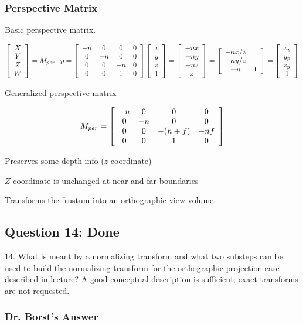 \documentclass[11pt]{article}
\begin{document}
\begin{spacing}{1.2}
\subsubsection{Perspective Matrix}

Basic perspective matrix.  


$$
\left[
	\begin{array}{cccc}
		X \cr
		Y \cr
		Z \cr
		W \cr
	\end{array}
\right]
=
M_{per} \cdot p = 
\left[
	\begin{array}{cccc}
		-n & 0 & 0 & 0 \cr
		0 & -n & 0 & 0 \cr
		0 & 0 & -n & 0 \cr
		0 & 0 & 1 & 0 \cr
	\end{array}
\right]
\left[
	\begin{array}{cccc}
		x \cr y \cr z \cr 1
	\end{array}
\right]
= 
\left[
	\begin{array}{cccc}
		-nx \cr -ny \cr -nz \cr z
	\end{array}
\right]
=
\left[
	\begin{array}{cccc}
		-nx/z \cr -ny/z \cr -n & 1 \cr
	\end{array}
\right]
=
\left[
	\begin{array}{cccc}
		x_p \cr y_p \cr z_p \cr 1 \cr
	\end{array}
\right]
$$

Generalized perspective matrix

$$
M_{per} = 
\left[
	\begin{array}{cccc}
		-n & 0 & 0 & 0 \cr
		0 & -n & 0 & 0 \cr
		0 & 0 & -(n+f) & -nf \cr
		0 & 0 & 1 & 0 \cr
	\end{array}
\right]
$$

Preserves some depth info ($z$ coordinate)

$Z$-coordinate is unchanged at near and far boundaries

Transforms the frustum into an orthographic view volume.  

\subsection{Question 14:  Done}
14.  What is meant by a normalizing transform and what two substeps can be used to build the normalizing transform for the orthographic projection case described in lecture?  A good conceptual description is sufficient; exact transforms are not requested.

\subsubsection{Dr. Borst's Answer}


\end{spacing}
\end{document}

